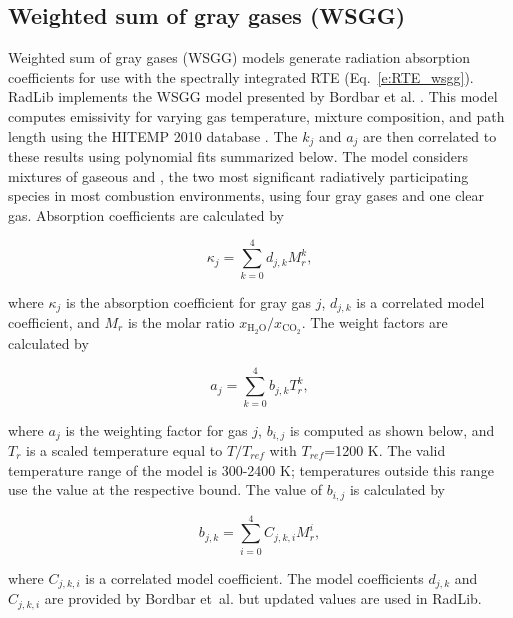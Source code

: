 \documentclass[preprint,12pt]{elsarticle}
\begin{document}

\subsection{Weighted sum of gray gases (WSGG)} \label{s:wsgg}

Weighted sum of gray gases (WSGG) models generate radiation absorption coefficients for use with the spectrally integrated RTE (Eq.~\ref{e:RTE_wsgg}).
RadLib implements the WSGG model presented by Bordbar et al. \citep{Bordbar_2014,Bordbar_2020}. This model computes emissivity for varying gas temperature, mixture composition, and path length using the HITEMP 2010 database \cite{Rothman_2010}. The $k_j$ and $a_j$ are then correlated to these results using polynomial fits summarized below. The model considers mixtures of gaseous  and , the two most significant radiatively participating species in most combustion environments, using four gray gases and one clear gas. Absorption coefficients are calculated by 
%
\begin{linenomath}
\begin{equation}
    \kappa_j=\sum_{k=0}^{4}d_{j,k}M_r^k,
\end{equation}
\end{linenomath}
%
where $\kappa_j$ is the absorption coefficient for gray gas $j$, $d_{j,k}$ is a correlated model coefficient, and $M_r$ is the molar ratio $x_{\mathrm{H_2O}}/x_{\mathrm{CO_2}}$. The weight factors are calculated by 
%
\begin{linenomath}
\begin{equation}
    a_j=\sum_{k=0}^{4}b_{j,k}T_r^k,
\end{equation}
\end{linenomath}
%
where $a_j$ is the weighting factor for gas $j$, $b_{i,j}$ is computed as shown below,  and $T_r$ is a scaled temperature equal to $T/T_{ref}$ with $T_{ref}$=1200 K. The valid temperature range of the model is 300-2400 K; temperatures outside this range use the value at the respective bound. The value of $b_{i,j}$ is calculated by 
%
\begin{linenomath}
\begin{equation}
 b_{j,k}=\sum_{i=0}^{4}C_{j,k,i}M_r^i,
\end{equation}
\end{linenomath}
%
where $C_{j,k,i}$ is a correlated model coefficient. The model coefficients $d_{j,k}$ and $C_{j,k,i}$ are provided by Bordbar et~al. \citep{Bordbar_2014,Bordbar_2020} but updated values are used in RadLib. 
\end{document}
